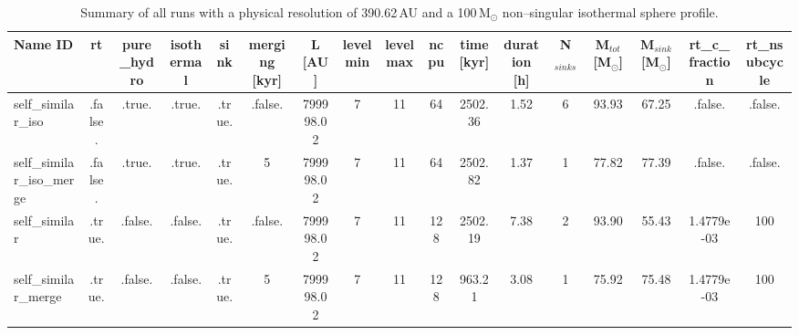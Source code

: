 \begin{table}
\begin{adjustbox}{width=1.8\textheight}
\begin{tabular}{lcccccccccccccccc}
\toprule
Name ID & rt & pure\_hydro & isothermal & sink & merging [kyr] & L [AU] & levelmin & levelmax & ncpu & time [kyr] & duration [h] & N$_{sinks}$ & M$_{tot}$ [M$_{\odot}$] & M$_{sink}$ [M$_{\odot}$] & rt\_c\_fraction & rt\_nsubcycle \\
\midrule
self\_similar\_iso & .false. & .true. & .true. & .true. & .false. & 799998.02 & 7 & 11 & 64 & 2502.36 & 1.52 & 6 & 93.93 & 67.25 & .false. & .false. \\
self\_similar\_iso\_merge & .false. & .true. & .true. & .true. & 5 & 799998.02 & 7 & 11 & 64 & 2502.82 & 1.37 & 1 & 77.82 & 77.39 & .false. & .false. \\
self\_similar & .true. & .false. & .false. & .true. & .false. & 799998.02 & 7 & 11 & 128 & 2502.19 & 7.38 & 2 & 93.90 & 55.43 & 1.4779e-03 & 100 \\
self\_similar\_merge & .true. & .false. & .false. & .true. & 5 & 799998.02 & 7 & 11 & 128 & 963.21 & 3.08 & 1 & 75.92 & 75.48 & 1.4779e-03 & 100 \\
\bottomrule
\end{tabular}
\end{adjustbox}
\caption[Low--resolution runs]{Summary of all runs with a physical resolution of 390.62\,AU and a 100\,M$_{\odot}$ non--singular isothermal sphere profile.}
\label{tab:selfsim}
\end{table}
